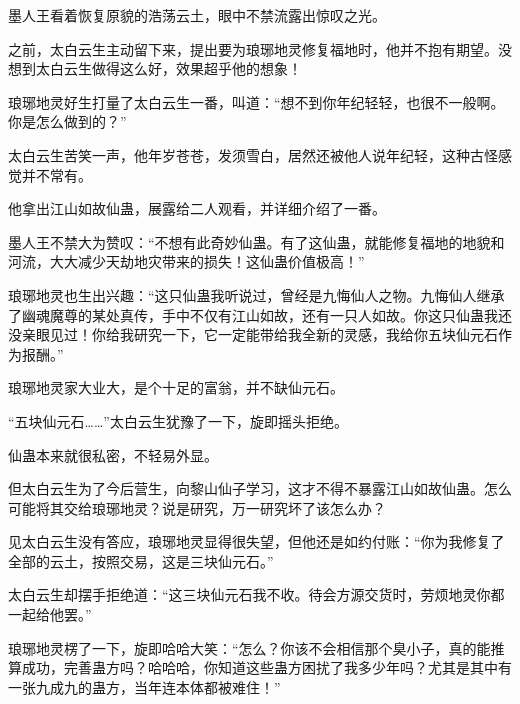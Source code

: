\begin{this_body}
墨人王看着恢复原貌的浩荡云土，眼中不禁流露出惊叹之光。

之前，太白云生主动留下来，提出要为琅琊地灵修复福地时，他并不抱有期望。没想到太白云生做得这么好，效果超乎他的想象！

琅琊地灵好生打量了太白云生一番，叫道：“想不到你年纪轻轻，也很不一般啊。你是怎么做到的？”

太白云生苦笑一声，他年岁苍苍，发须雪白，居然还被他人说年纪轻，这种古怪感觉并不常有。

他拿出江山如故仙蛊，展露给二人观看，并详细介绍了一番。

墨人王不禁大为赞叹：“不想有此奇妙仙蛊。有了这仙蛊，就能修复福地的地貌和河流，大大减少天劫地灾带来的损失！这仙蛊价值极高！”

琅琊地灵也生出兴趣：“这只仙蛊我听说过，曾经是九悔仙人之物。九悔仙人继承了幽魂魔尊的某处真传，手中不仅有江山如故，还有一只人如故。你这只仙蛊我还没亲眼见过！你给我研究一下，它一定能带给我全新的灵感，我给你五块仙元石作为报酬。”

琅琊地灵家大业大，是个十足的富翁，并不缺仙元石。

“五块仙元石……”太白云生犹豫了一下，旋即摇头拒绝。

仙蛊本来就很私密，不轻易外显。

但太白云生为了今后营生，向黎山仙子学习，这才不得不暴露江山如故仙蛊。怎么可能将其交给琅琊地灵？说是研究，万一研究坏了该怎么办？

见太白云生没有答应，琅琊地灵显得很失望，但他还是如约付账：“你为我修复了全部的云土，按照交易，这是三块仙元石。”

太白云生却摆手拒绝道：“这三块仙元石我不收。待会方源交货时，劳烦地灵你都一起给他罢。”

琅琊地灵楞了一下，旋即哈哈大笑：“怎么？你该不会相信那个臭小子，真的能推算成功，完善蛊方吗？哈哈哈，你知道这些蛊方困扰了我多少年吗？尤其是其中有一张九成九的蛊方，当年连本体都被难住！”

\end{this_body}

